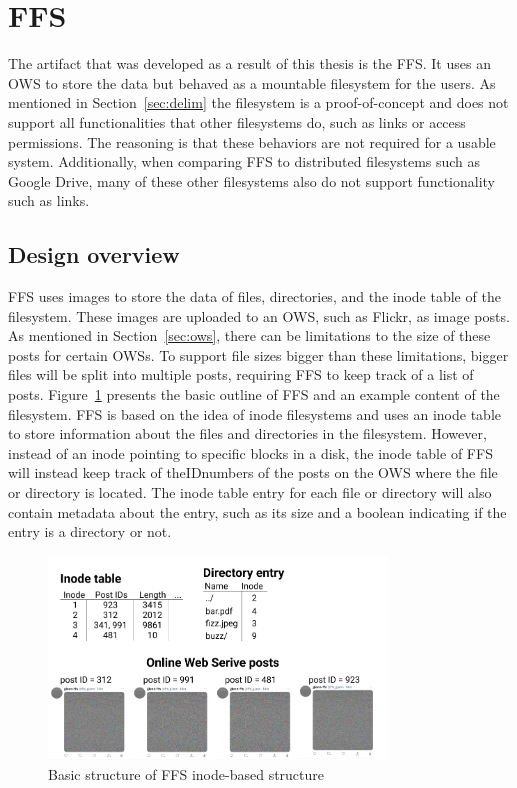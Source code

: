 \section{FFS}
The artifact that was developed as a result of this thesis is the \acrfull{FFS}. It uses an \gls{OWS} to store the data but behaved as a mountable filesystem for the users. As mentioned in Section~\ref{sec:delim} the filesystem is a \mbox{proof-of-concept} and does not support all functionalities that other filesystems do, such as links or access permissions. The reasoning is that these behaviors are not required for a usable system. Additionally, when comparing \gls{FFS} to distributed filesystems such as Google Drive, many of these other filesystems also do not support functionality such as links.

\subsection{Design overview}
\gls{FFS} uses images to store the data of files, directories, and the inode table of the filesystem. These images are uploaded to an \gls{OWS}, such as Flickr, as image posts. As mentioned in Section~\ref{sec:ows}, there can be limitations to the size of these posts for certain \gls{OWS}s. To support file sizes bigger than these limitations, bigger files will be split into multiple posts, requiring \gls{FFS} to keep track of a list of posts. Figure~\ref{fig:ffs_inode_diag} presents the basic outline of \gls{FFS} and an example content of the filesystem. \gls{FFS} is based on the idea of inode filesystems and uses an inode table to store information about the files and directories in the filesystem. However, instead of an inode pointing to specific blocks in a disk, the inode table of \gls{FFS} will instead keep track of theIDnumbers of the posts on the \gls{OWS} where the file or directory is located. The inode table entry for each file or directory will also contain metadata about the entry, such as its size and a boolean indicating if the entry is a directory or not.

\begin{figure}[!ht]
	\begin{center}
	  \includegraphics[width=0.8\textwidth]{figures/ffs_inode_diagram.png}
	\end{center}
	\caption{Basic structure of \gls{FFS} \mbox{inode-based} structure}
	\label{fig:ffs_inode_diag}
\end{figure}

